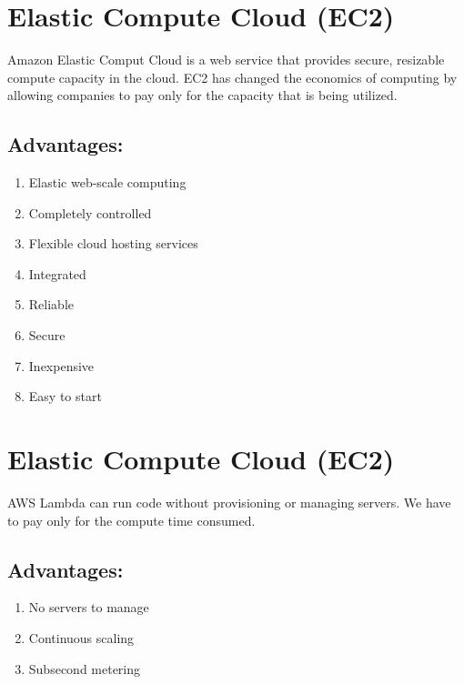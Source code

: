\section{Elastic Compute Cloud (EC2)} \cite{EC2Doc}
Amazon Elastic Comput Cloud is a web service that provides secure, resizable compute capacity in the cloud. EC2 has changed the economics of computing by allowing companies to pay only for the capacity that is being utilized.

\subsection{Advantages:}
\begin{enumerate}
	\item Elastic web-scale computing
	\item Completely controlled
	\item Flexible cloud hosting services
	\item Integrated
	\item Reliable
	\item Secure
	\item Inexpensive
	\item Easy to start
\end{enumerate}

\section{Elastic Compute Cloud (EC2)} \cite{LambdaDoc}
AWS Lambda can run code without provisioning or managing servers. We have to pay only for the compute time consumed.

\subsection{Advantages:}
\begin{enumerate}
	\item No servers to manage
	\item Continuous scaling
	\item Subsecond metering
\end{enumerate}